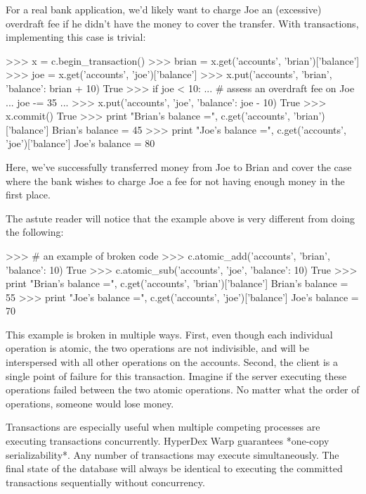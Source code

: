 For a real bank application, we'd likely want to charge Joe an (excessive)
overdraft fee if he didn't have the money to cover the transfer.  With
transactions, implementing this case is trivial:

\begin{pyconcode}
>>> x = c.begin_transaction()
>>> brian = x.get('accounts', 'brian')['balance']
>>> joe = x.get('accounts', 'joe')['balance']
>>> x.put('accounts', 'brian', {'balance': brian + 10})
True
>>> if joe < 10:
...     # assess an overdraft fee on Joe
...     joe -= 35
...
>>> x.put('accounts', 'joe', {'balance': joe - 10})
True
>>> x.commit()
True
>>> print "Brian's balance =", c.get('accounts', 'brian')['balance']
Brian's balance = 45
>>> print "Joe's balance =", c.get('accounts', 'joe')['balance']
Joe's balance = 80
\end{pyconcode}

Here, we've successfully transferred money from Joe to Brian and cover the case
where the bank wishes to charge Joe a fee for not having enough money in the
first place.

The astute reader will notice that the example above is very different from
doing the following:

\begin{pyconcode}
>>> # an example of broken code
>>> c.atomic_add('accounts', 'brian', {'balance': 10})
True
>>> c.atomic_sub('accounts', 'joe', {'balance': 10})
True
>>> print "Brian's balance =", c.get('accounts', 'brian')['balance']
Brian's balance = 55
>>> print "Joe's balance =", c.get('accounts', 'joe')['balance']
Joe's balance = 70
\end{pyconcode}

This example is broken in multiple ways.  First, even though each individual
operation is atomic, the two operations are not indivisible, and will be
interspersed with all other operations on the accounts.  Second, the client is a
single point of failure for this transaction.  Imagine if the server executing
these operations failed between the two atomic operations.  No matter what the
order of operations, someone would lose money.

Transactions are especially useful when multiple competing processes are
executing transactions concurrently.  HyperDex Warp guarantees *one-copy
serializability*.  Any number of transactions may execute simultaneously.
The final state of the database will always be identical to executing the
committed transactions sequentially without concurrency.

